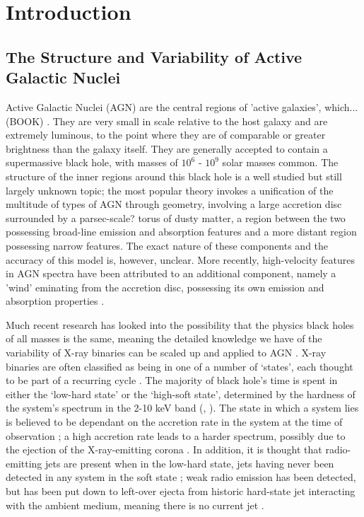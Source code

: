 \documentclass[letters,useAMS,usenatbib]{samnote}
\begin{document}
\newpage
\tableofcontents
\newpage

\section{Introduction}


\subsection{The Structure and Variability of Active Galactic Nuclei}

Active Galactic Nuclei (AGN) are the central regions of 'active galaxies', which...(BOOK) . They are very small in scale relative to the host galaxy and are extremely
luminous, to the point where they are of comparable or greater brightness than the galaxy itself. They are generally accepted to contain a supermassive black hole,
with masses of $10^6$ - $10^9$ solar masses common. The structure of the inner regions around this black hole is a well studied but still largely unknown topic;
the most popular theory invokes a unification of the multitude of types of AGN through geometry, involving a large accretion disc surrounded by a parsec-scale? torus
of dusty matter, a region between the two possessing broad-line emission and absorption features and a more distant region possessing narrow features. The exact
nature of these components and the accuracy of this model is, however, unclear. More recently, high-velocity features in AGN spectra have been attributed to an
additional component, namely a 'wind' eminating from the accretion disc, possessing its own emission and absorption properties \citet{elvis}.

Much recent research has looked into the possibility that the physics black holes of all masses is the same, meaning the detailed knowledge we have of the variability of
X-ray binaries can be scaled up and applied to AGN \citep{mchardy06}. X-ray binaries are often classified as being in one of a number of `states', each thought to be
part of a recurring cycle \citep{mcclintock06}. The majority of black hole's time is spent in either the `low-hard state' or the `high-soft
state', determined by the hardness of the system's spectrum in the 2-10 keV band (\citet{jones11}, \citet{belloni10}). The state in which a system lies is believed to be
dependant on the accretion rate in the system at the time of observation \citep{mcclintock06}; a high accretion rate leads to a harder spectrum, possibly due to the
ejection of the X-ray-emitting corona \citep{fender04}. In addition, it is thought that radio-emitting jets are present when in the low-hard state, jets having never been
detected in any system in the soft state \citep{stirling01}; weak radio emission has been detected, but has been put down to left-over ejecta from historic hard-state jet
interacting with the ambient medium, meaning there is no current jet \citep{fender09}. 
\end{document}
